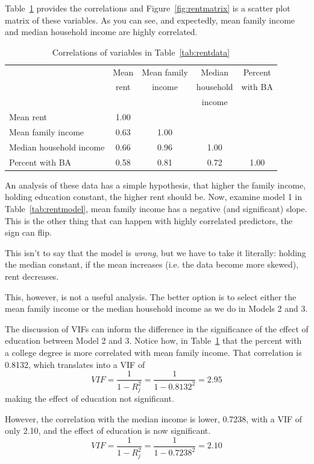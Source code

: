Table~\ref{tab:rentcorr} provides the correlations and Figure~\ref{fig:rentmatrix} is a scatter plot matrix of these variables. As you can see, and expectedly, mean family income and median household income are highly correlated.

\begin{table}[htbp]\centering
 \caption{Correlations of variables in Table~\ref{tab:rentdata}
\label{tab:rentcorr}}
\begin{tabular}{lcccc}
\hline
& Mean & Mean family & Median & Percent \\
& rent & income & household & with BA \\
& & & income & \\
\hline
Mean rent & 1.00 \\
Mean family income & 0.63 & 1.00 \\
Median household income & 0.66 & 0.96 & 1.00 \\
Percent with BA & 0.58 & 0.81 & 0.72 & 1.00 \\
\hline
\end{tabular}
\end{table}

An analysis of these data has a simple hypothesis, that higher the family income, holding education constant, the higher rent should be. Now, examine model 1 in Table~\ref{tab:rentmodel}, mean family income has a negative (and significant) slope. This is the other thing that can happen with highly correlated predictors, the sign can flip.

This isn't to say that the model is {\it wrong}, but we have to take it literally: holding the median constant, if the mean increases (i.e. the data become more skewed), rent decreases.

This, however, is not a useful analysis. The better option is to select either the mean family income or the median household income as we do in Models 2 and 3.

The discussion of VIFs can inform the difference in the significance of the effect of education between Model 2 and 3. Notice how, in Table~\ref{tab:rentcorr} that the percent with a college degree is more correlated with mean family income. That correlation is 0.8132, which translates into a VIF of
\[
VIF = \frac{1}{1-R^2_j} = \frac{1}{1-0.8132^2}=2.95
\]
making the effect of education not significant.

However, the correlation with the median income is lower, 0.7238, with a VIF of only 2.10, and the effect of education is now significant.
\[
VIF = \frac{1}{1-R^2_j} = \frac{1}{1-0.7238^2}=2.10
\]

